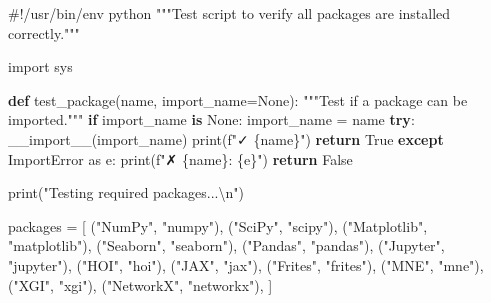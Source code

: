 \documentclass[
  11pt,
  letterpaper,
  oneside,
  openany]{book}
\newenvironment{Shaded}{\begin{snugshade}}{\end{snugshade}}
\newcommand{\BuiltInTok}[1]{\textcolor[rgb]{0.00,0.23,0.31}{#1}}
\newcommand{\CharTok}[1]{\textcolor[rgb]{0.13,0.47,0.30}{#1}}
\newcommand{\CommentTok}[1]{\textcolor[rgb]{0.37,0.37,0.37}{#1}}
\newcommand{\ControlFlowTok}[1]{\textcolor[rgb]{0.00,0.23,0.31}{\textbf{#1}}}
\newcommand{\ImportTok}[1]{\textcolor[rgb]{0.00,0.46,0.62}{#1}}
\newcommand{\KeywordTok}[1]{\textcolor[rgb]{0.00,0.23,0.31}{\textbf{#1}}}
\newcommand{\NormalTok}[1]{\textcolor[rgb]{0.00,0.23,0.31}{#1}}
\newcommand{\OperatorTok}[1]{\textcolor[rgb]{0.37,0.37,0.37}{#1}}
\newcommand{\PreprocessorTok}[1]{\textcolor[rgb]{0.68,0.00,0.00}{#1}}
\newcommand{\SpecialCharTok}[1]{\textcolor[rgb]{0.37,0.37,0.37}{#1}}
\newcommand{\SpecialStringTok}[1]{\textcolor[rgb]{0.13,0.47,0.30}{#1}}
\newcommand{\StringTok}[1]{\textcolor[rgb]{0.13,0.47,0.30}{#1}}
\newcommand{\VariableTok}[1]{\textcolor[rgb]{0.07,0.07,0.07}{#1}}
\begin{document}
\begin{Shaded}
\begin{Highlighting}[]
\CommentTok{\#!/usr/bin/env python}
\CommentTok{"""Test script to verify all packages are installed correctly."""}

\ImportTok{import}\NormalTok{ sys}

\KeywordTok{def}\NormalTok{ test\_package(name, import\_name}\OperatorTok{=}\VariableTok{None}\NormalTok{):}
    \CommentTok{"""Test if a package can be imported."""}
    \ControlFlowTok{if}\NormalTok{ import\_name }\KeywordTok{is} \VariableTok{None}\NormalTok{:}
\NormalTok{        import\_name }\OperatorTok{=}\NormalTok{ name}
    \ControlFlowTok{try}\NormalTok{:}
        \BuiltInTok{\_\_import\_\_}\NormalTok{(import\_name)}
        \BuiltInTok{print}\NormalTok{(}\SpecialStringTok{f"✓ }\SpecialCharTok{\{}\NormalTok{name}\SpecialCharTok{\}}\SpecialStringTok{"}\NormalTok{)}
        \ControlFlowTok{return} \VariableTok{True}
    \ControlFlowTok{except} \PreprocessorTok{ImportError} \ImportTok{as}\NormalTok{ e:}
        \BuiltInTok{print}\NormalTok{(}\SpecialStringTok{f"✗ }\SpecialCharTok{\{}\NormalTok{name}\SpecialCharTok{\}}\SpecialStringTok{: }\SpecialCharTok{\{}\NormalTok{e}\SpecialCharTok{\}}\SpecialStringTok{"}\NormalTok{)}
        \ControlFlowTok{return} \VariableTok{False}

\BuiltInTok{print}\NormalTok{(}\StringTok{"Testing required packages...}\CharTok{\textbackslash{}n}\StringTok{"}\NormalTok{)}

\NormalTok{packages }\OperatorTok{=}\NormalTok{ [}
\NormalTok{    (}\StringTok{"NumPy"}\NormalTok{, }\StringTok{"numpy"}\NormalTok{),}
\NormalTok{    (}\StringTok{"SciPy"}\NormalTok{, }\StringTok{"scipy"}\NormalTok{),}
\NormalTok{    (}\StringTok{"Matplotlib"}\NormalTok{, }\StringTok{"matplotlib"}\NormalTok{),}
\NormalTok{    (}\StringTok{"Seaborn"}\NormalTok{, }\StringTok{"seaborn"}\NormalTok{),}
\NormalTok{    (}\StringTok{"Pandas"}\NormalTok{, }\StringTok{"pandas"}\NormalTok{),}
\NormalTok{    (}\StringTok{"Jupyter"}\NormalTok{, }\StringTok{"jupyter"}\NormalTok{),}
\NormalTok{    (}\StringTok{"HOI"}\NormalTok{, }\StringTok{"hoi"}\NormalTok{),}
\NormalTok{    (}\StringTok{"JAX"}\NormalTok{, }\StringTok{"jax"}\NormalTok{),}
\NormalTok{    (}\StringTok{"Frites"}\NormalTok{, }\StringTok{"frites"}\NormalTok{),}
\NormalTok{    (}\StringTok{"MNE"}\NormalTok{, }\StringTok{"mne"}\NormalTok{),}
\NormalTok{    (}\StringTok{"XGI"}\NormalTok{, }\StringTok{"xgi"}\NormalTok{),}
\NormalTok{    (}\StringTok{"NetworkX"}\NormalTok{, }\StringTok{"networkx"}\NormalTok{),}
\NormalTok{]}


\end{Highlighting}
\end{Shaded}
\end{document}

